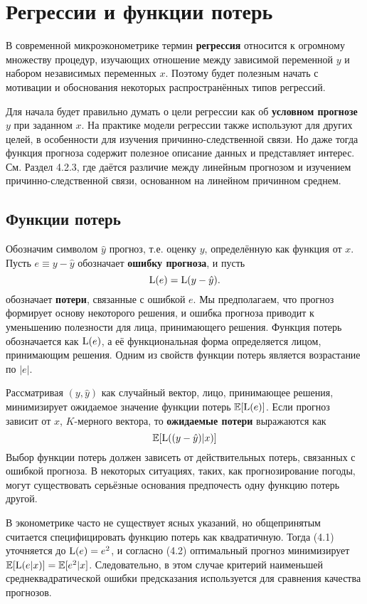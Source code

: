 \section{Регрессии и функции потерь}
В современной микроэконометрике термин \textbf{регрессия} относится к огромному множеству процедур, изучающих отношение между зависимой переменной $y$ и набором независимых переменных $x$. Поэтому будет полезным начать с мотивации и обоснования некоторых распространённых типов регрессий.

Для начала будет правильно думать о цели регрессии как об \textbf{условном прогнозе} $y$ при заданном $x$. На практике модели регрессии также используют для других целей, в особенности для изучения причинно-следственной связи. Но даже тогда функция прогноза содержит полезное описание данных и представляет интерес. См. Раздел 4.2.3, где даётся различие между линейным прогнозом и изучением причинно-следственной связи, основанном на линейном причинном среднем.

\subsection{Функции потерь}
Обозначим символом $\hat{y}$  прогноз, т.е. оценку $y$, определённую как функция от $x$. Пусть $e \equiv y - \hat{y} $ обозначает \textbf{ошибку прогноза}, и пусть
\begin{equation}
\mathrm{L}(e)=\mathrm{L}(y - \hat{y}).
\end{equation}
обозначает \textbf{потери}, связанные с ошибкой $e$. Мы предполагаем, что прогноз формирует основу некоторого решения, и ошибка прогноза приводит к уменьшению полезности для лица, принимающего решения. Функция потерь обозначается как $\mathrm{L}(e)$, а её функциональная форма определяется лицом, принимающим решения. Одним из свойств функции потерь является возрастание по $|e|$.

Рассматривая $(y, \hat{y})$ как случайный вектор, лицо, принимающее решения, минимизирует ожидаемое значение функции потерь $\mathbb{E}{[\mathrm{L}(e)]}$. Если прогноз зависит от $x$, $K$-мерного вектора, то \textbf{ожидаемые потери} выражаются как
\begin{equation}
\mathbb{E}{[\mathrm{L}((y - \hat{y})|x)]}
\end{equation}
Выбор функции потерь должен зависеть от действительных потерь, связанных с ошибкой прогноза. В некоторых ситуациях, таких, как прогнозирование погоды, могут существовать серьёзные основания предпочесть одну функцию потерь другой.

В эконометрике часто не существует ясных указаний, но общепринятым считается специфицировать функцию потерь как квадратичную. Тогда (4.1) уточняется до $\mathrm{L}(e)=e^2$, и согласно (4.2) оптимальный прогноз минимизирует $\mathbb{E}{[\mathrm{L}(e|x)]}=\mathbb{E}{[e^2|x]}$. Следовательно, в этом случае критерий наименьшей среднеквадратической ошибки предсказания используется для сравнения качества прогнозов.

